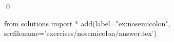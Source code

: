 
\begin{ex} 
  \label{ex:nosemicolon}
  
  \qed
\end{ex} 
\begin{python0}
from solutions import *
add(label="ex:nosemicolon",
    srcfilename='exercises/nosemicolon/answer.tex') 
\end{python0}
